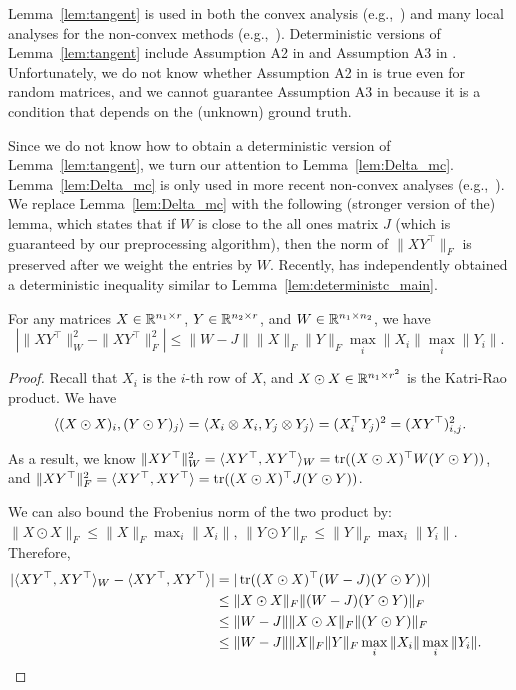 Lemma~\ref{lem:tangent} is used in both the convex analysis (e.g.,~\citep{recht2011simpler}) and many local analyses for the non-convex methods (e.g.,~\citep{sun2015guaranteed}). Deterministic versions of Lemma~\ref{lem:tangent} include Assumption A2 in \citep{BhojanapalliJ14} and Assumption A3 in \citep{LiLR16}. Unfortunately, we do not know whether Assumption A2 in \citep{BhojanapalliJ14} is true even for random matrices, and we cannot guarantee Assumption A3 in \citep{LiLR16} because it is a condition that depends on the (unknown) ground truth.

Since we do not know how to obtain a deterministic version of Lemma~\ref{lem:tangent}, we turn our attention to Lemma~\ref{lem:Delta_mc}.
Lemma~\ref{lem:Delta_mc} is only used in more recent non-convex analyses (e.g.,~\citep{sun2015guaranteed, GeJZ17}).
We replace Lemma~\ref{lem:Delta_mc} with the following (stronger version of the) lemma, which states that if $W$ is close to the all ones matrix $J$ (which is guaranteed by our preprocessing algorithm), then the norm of $\|XY^\top\|_F$ is preserved after we weight the entries by $W$.
Recently, \citep{chen2017memory} has independently obtained a deterministic inequality similar to Lemma~\ref{lem:deterministc_main}.

\begin{lemma}
\label{lem:deterministc_main}
For any matrices $X\in \mathbb{R}^{n_1\times r}$, $Y \in \mathbb{R}^{n_2\times r}$, and $W \in \mathbb{R}^{n_1 \times n_2}$, we have
\[
|\|XY^\top\|_W^2 - \|XY^\top\|_F^2| \le \|W-J\| \|X\|_F\|Y\|_F\max_{i}\|X_i\|\max_{i}\|Y_i\|.
\]
\end{lemma}

\begin{proof}
Recall that $X_i$ is the $i$-th row of $X$, and $X\odot X \in \mathbb{R}^{n_1 \times r^2}$ is the Katri-Rao product.
We have 
\[\langle (X\odot X)_i, (Y\odot Y)_j\rangle = \langle X_i\otimes X_i, Y_j\otimes Y_j\rangle = (X_i^\top Y_j)^2 = (X Y^\top)_{i,j}^2.\]

As a result, we know $\|XY^\top\|_W^2 = \langle XY^\top, XY^\top\rangle_W = \operatorname{tr}((X\odot X)^\top W (Y\odot Y))$, and $\|XY^\top\|_F^2 = \langle XY^\top, XY^\top\rangle = \operatorname{tr}((X\odot X)^\top J (Y\odot Y))$.

We can also bound the Frobenius norm of the two product by: $\|X\odot X\|_F \le \|X\|_F\max_{i}\|X_i\|$, $\|Y\odot Y\|_F \le \|Y\|_F\max_{i}\|Y_i\|$. Therefore,
\begin{align*}
|\inner{XY^\top, XY^\top}_W - \inner{XY^\top, XY^\top}|
& = |\tr((X\odot X)^\top (W-J) (Y\odot Y))| \\
& \le \|X\odot X\|_F \|(W-J) (Y\odot Y)\|_F \\
& \le \|W-J\| \|X\odot X\|_F \|(Y\odot Y)\|_F  \\
& \le \|W-J\| \|X\|_F\|Y\|_F\max_{i}\|X_i\|\max_{i}\|Y_i\|. \tag*{\jmlrQED} %
\end{align*}
\renewcommand{\jmlrQED}{}
\end{proof}

